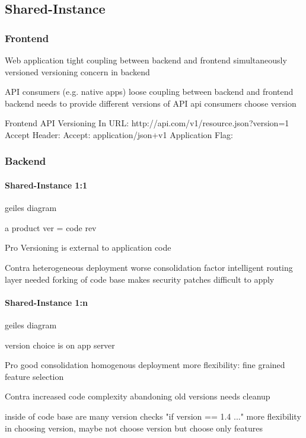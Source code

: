 \subsection{Shared-Instance}

\subsubsection{Frontend}
  Web application
  tight coupling between backend and frontend
  simultaneously versioned
  versioning concern in backend

  API consumers (e.g. native apps)
  loose coupling between backend and frontend
  backend needs to provide different versions of API
  api consumers choose version

  Frontend API Versioning
    In URL:
      http://api.com/v1/resource.json?version=1
    Accept Header:
      Accept: application/json+v1
    Application Flag:

\subsubsection{Backend}
\paragraph{Shared-Instance 1:1}
geiles diagram

a product ver = code rev


Pro
Versioning is external to application code

Contra
heterogeneous deployment
worse consolidation factor
intelligent routing layer needed
forking of code base makes security patches difficult to apply



\paragraph{Shared-Instance 1:n}
geiles diagram


version choice is on app server


Pro
good consolidation
homogenous deployment
more flexibility: fine grained feature selection

Contra
increased code complexity
abandoning old versions needs cleanup



inside of code base are many version checks "if version == 1.4 ..."
more flexibility in choosing version, maybe not choose version but choose only features

